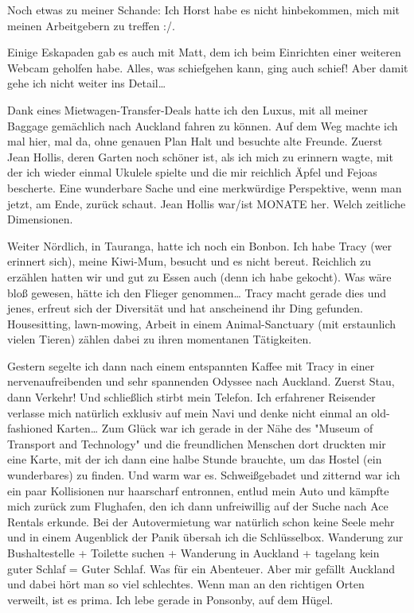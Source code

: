 Noch etwas zu meiner Schande: Ich Horst habe es nicht hinbekommen, mich
mit meinen Arbeitgebern zu treffen :/.

Einige Eskapaden gab es auch mit Matt, dem ich beim Einrichten einer
weiteren Webcam geholfen habe. Alles, was schiefgehen kann, ging auch
schief! Aber damit gehe ich nicht weiter ins Detail\ldots{}

Dank eines Mietwagen-Transfer-Deals hatte ich den Luxus, mit all meiner
Baggage gemächlich nach Auckland fahren zu können. Auf dem Weg machte
ich mal hier, mal da, ohne genauen Plan Halt und besuchte alte Freunde.
Zuerst Jean Hollis, deren Garten noch schöner ist, als ich mich zu
erinnern wagte, mit der ich wieder einmal Ukulele spielte und die mir
reichlich Äpfel und Fejoas bescherte. Eine wunderbare Sache und eine
merkwürdige Perspektive, wenn man jetzt, am Ende, zurück schaut. Jean
Hollis war/ist MONATE her. Welch zeitliche Dimensionen.

Weiter Nördlich, in Tauranga, hatte ich noch ein Bonbon. Ich habe Tracy
(wer erinnert sich), meine Kiwi-Mum, besucht und es nicht bereut.
Reichlich zu erzählen hatten wir und gut zu Essen auch (denn ich habe
gekocht). Was wäre bloß gewesen, hätte ich den Flieger genommen\ldots{}
Tracy macht gerade dies und jenes, erfreut sich der Diversität und hat
anscheinend ihr Ding gefunden. Housesitting, lawn-mowing, Arbeit in
einem Animal-Sanctuary (mit erstaunlich vielen Tieren) zählen dabei zu
ihren momentanen Tätigkeiten.

Gestern segelte ich dann nach einem entspannten Kaffee mit Tracy in
einer nervenaufreibenden und sehr spannenden Odyssee nach Auckland.
Zuerst Stau, dann Verkehr! Und schließlich stirbt mein Telefon. Ich
erfahrener Reisender verlasse mich natürlich exklusiv auf mein Navi und
denke nicht einmal an old-fashioned Karten\ldots{} Zum Glück war ich
gerade in der Nähe des "Museum of Transport and Technology" und die
freundlichen Menschen dort druckten mir eine Karte, mit der ich dann
eine halbe Stunde brauchte, um das Hostel (ein wunderbares) zu finden.
Und warm war es. Schweißgebadet und zitternd war ich ein paar
Kollisionen nur haarscharf entronnen, entlud mein Auto und kämpfte mich
zurück zum Flughafen, den ich dann unfreiwillig auf der Suche nach Ace
Rentals erkunde. Bei der Autovermietung war natürlich schon keine Seele
mehr und in einem Augenblick der Panik übersah ich die Schlüsselbox.
Wanderung zur Bushaltestelle + Toilette suchen + Wanderung in Auckland +
tagelang kein guter Schlaf = Guter Schlaf. Was für ein Abenteuer. Aber
mir gefällt Auckland und dabei hört man so viel schlechtes. Wenn man an
den richtigen Orten verweilt, ist es prima. Ich lebe gerade in Ponsonby,
auf dem Hügel.

